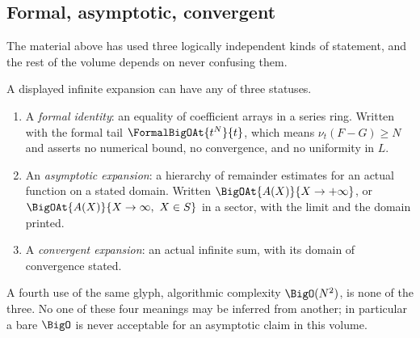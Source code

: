 \documentclass[11pt,oneside]{article}
\theoremstyle{plain}
\theoremstyle{definition}
\theoremstyle{remark}
\newcommand{\ordt}{\nu_{t}}                              %
\begin{document}
\subsection{Formal, asymptotic, convergent}
\label{plt:sec:mot-three-statuses}

The material above has used three logically independent kinds of statement, and
the rest of the volume depends on never confusing them.

\begin{warningbox}
A displayed infinite expansion can have any of three statuses.
\begin{enumerate}
\item A \emph{formal identity}: an equality of coefficient arrays in a series
  ring.  Written with the formal tail \(\FormalBigOAt{t^{N}}{t}\), which means
  \(\ordt(F-G)\ge N\) and asserts no numerical bound, no convergence, and no
  uniformity in \(L\).
\item An \emph{asymptotic expansion}: a hierarchy of remainder estimates for an
  actual function on a stated domain.  Written \(\BigOAt{A(X)}{X\to+\infty}\),
  or \(\BigOAt{A(X)}{X\to\infty,\ X\in S}\) in a sector, with the limit and the
  domain printed.
\item A \emph{convergent expansion}: an actual infinite sum, with its domain of
  convergence stated.
\end{enumerate}
A fourth use of the same glyph, algorithmic complexity \(\BigO(N^{2})\), is
none of the three.  No one of these four meanings may be inferred from another;
in particular a bare \(\BigO\) is never acceptable for an asymptotic claim in
this volume.
\end{warningbox}
\end{document}
